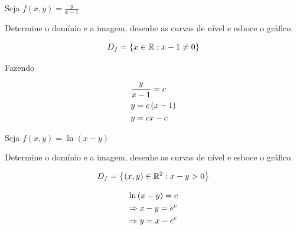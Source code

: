 \documentclass{book}
\begin{document}
\begin{ex}
Seja $\displaystyle f\left( {x,y} \right) = \frac{y}{x - 1}$

Determine o dom\'inio e a imagem, desenhe as curvas de n\'ivel e esboce o gr\'afico.
\end{ex}

\newpage 

\begin{sol}
\[
D_f  = \left\{ {x \in \mathbb{R}:x - 1 \ne 0} \right\}
\]

Fazendo

\[
\begin{gathered}
\frac{y}
{{x - 1}} = c \hfill \\
y = c\left( {x - 1} \right) \hfill \\
y = cx - c \hfill \\
\end{gathered}
\]



\end{sol}

\begin{ex}
Seja $f\left( {x,y} \right) = \ln \left( {x - y} \right)$

Determine o dom\'inio e a imagem, desenhe as curvas de n\'ivel e esboce o gr\'afico.
\end{ex}

\begin{sol}
\[
D_f  = \left\{ {\left( {x,y} \right) \in \mathbb{R}^2 :x - y > 0} \right\}
\]


\[
\begin{gathered}
\ln \left( {x - y} \right) = c \hfill \\
\Rightarrow x - y = e^c  \hfill \\
\Rightarrow y = x - e^c  \hfill \\
\end{gathered}
\]



\end{sol}
\end{document}
